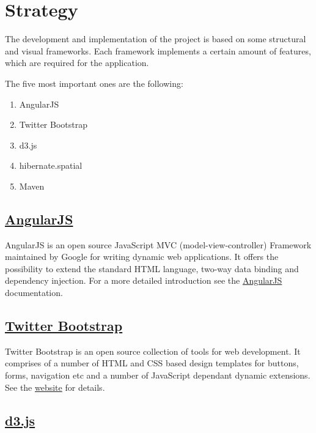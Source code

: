 
\section{Strategy}

The development and implementation of the project is based on some
structural and visual frameworks. Each framework implements a certain amount of
features, which are required for the application.

The five most important ones are the following:
\begin{enumerate}
\def\labelenumi{\arabic{enumi}.}
\itemsep1pt\parskip0pt
\item
  AngularJS
\item
  Twitter Bootstrap
\item
  d3.js
\item
  hibernate.spatial
\item
  Maven
\end{enumerate}

\subsection{\href{http://angularjs.org/}{\textbf{AngularJS}}}\label{angularjs}

AngularJS is an open source JavaScript MVC (model-view-controller)
Framework maintained by Google for writing dynamic web applications. It
offers the possibility to extend the standard HTML language, two-way
data binding and dependency injection. For a more detailed introduction
see the \href{http://docs.angularjs.org/guide/introduction}{AngularJS}
documentation.

\subsection{\href{http://getbootstrap.com/components/}{\textbf{Twitter
Bootstrap}}}\label{twitter-bootstrap}

Twitter Bootstrap is an open source collection of tools for web
development. It comprises of a number of HTML and CSS based design
templates for buttons, forms, navigation etc and a number of JavaScript
dependant dynamic extensions. See the
\href{http://getbootstrap.com/}{website} for details.

\subsection{\href{http://d3js.org/}{\textbf{d3.js}}}\label{d3.js}

